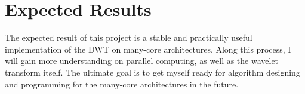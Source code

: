 \documentclass{article}
\begin{document}
\section{Expected Results}
%
The expected result of this project is a stable and practically useful 
implementation of the DWT on many-core architectures.
%
Along this process, I will gain more understanding on parallel
computing, as well as the wavelet transform itself.
%
The ultimate goal is to get myself ready for algorithm designing and 
programming for the many-core architectures in the future.







\end{document}
